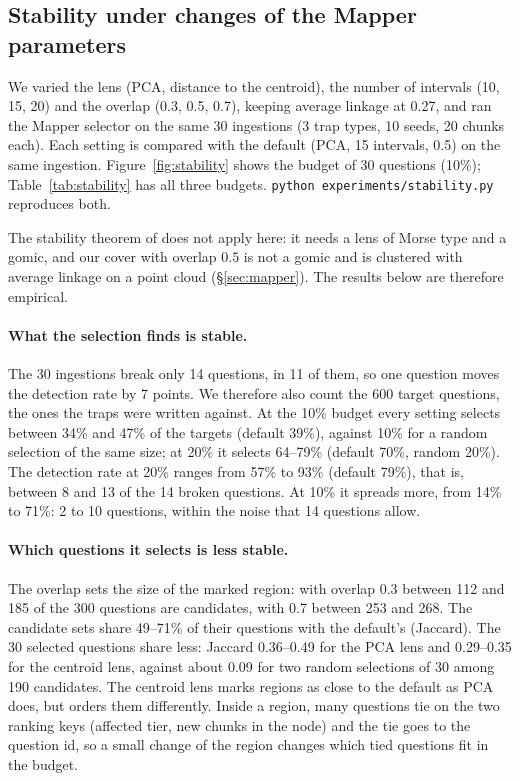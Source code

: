 \subsection{Stability under changes of the Mapper parameters}
\label{sec:stability}

We varied the lens (PCA, distance to the centroid), the number of intervals
(10, 15, 20) and the overlap (0.3, 0.5, 0.7), keeping average linkage at 0.27,
and ran the Mapper selector on the same 30 ingestions (3 trap types, 10 seeds,
20 chunks each). Each setting is compared with the default (PCA, 15 intervals,
0.5) on the same ingestion. Figure~\ref{fig:stability} shows the budget of 30
questions (10\%); Table~\ref{tab:stability} has all three budgets.
\texttt{python experiments/stability.py} reproduces both.

The stability theorem of \cite{carriere2018structure} does not apply here: it
needs a lens of Morse type and a gomic, and our cover with overlap $0.5$ is not
a gomic and is clustered with average linkage on a point cloud
(\S\ref{sec:mapper}). The results below are therefore empirical.

\paragraph{What the selection finds is stable.} The 30 ingestions break only
14 questions, in 11 of them, so one question moves the detection rate by 7
points. We therefore also count the 600 target questions, the ones the traps
were written against. At the 10\% budget every setting selects between 34\%
and 47\% of the targets (default 39\%), against 10\% for a random selection of
the same size; at 20\% it selects 64--79\% (default 70\%, random 20\%). The
detection rate at 20\% ranges from 57\% to 93\% (default 79\%), that is, between
8 and 13 of the 14 broken questions. At 10\% it spreads more, from 14\% to 71\%:
2 to 10 questions, within the noise that 14 questions allow.

\paragraph{Which questions it selects is less stable.} The overlap sets the
size of the marked region: with overlap 0.3 between 112 and 185 of the 300
questions are candidates, with 0.7 between 253 and 268. The candidate sets
share 49--71\% of their questions with the default's (Jaccard). The 30 selected
questions share less: Jaccard 0.36--0.49 for the PCA lens and 0.29--0.35 for the
centroid lens, against about 0.09 for two random selections of 30 among 190
candidates. The centroid lens marks regions as close to the default as PCA
does, but orders them differently. Inside a region, many questions tie on the
two ranking keys (affected tier, new chunks in the node) and the tie goes to the
question id, so a small change of the region changes which tied questions fit
in the budget.

